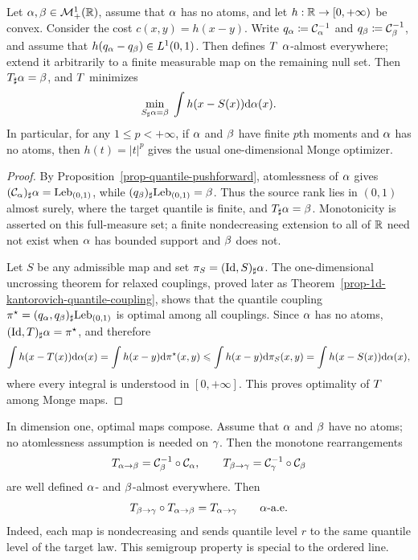 \begin{thm}\label{prop-1d-quantile-map}
	Let $\alpha,\beta\in\mathcal{M}_+^1(\mathbb{R})$, assume that $\alpha$ has no atoms, and let $h:\mathbb{R}\to[0,+\infty)$ be convex. Consider the cost $c(x,y)=h(x-y)$. Write $q_\alpha\coloneqq\mathcal{C}_{\alpha}^{-1}$ and $q_\beta\coloneqq\mathcal{C}_{\beta}^{-1}$, and assume that $h(q_\alpha-q_\beta)\in L^1(0,1)$. Then
	defines $T$ $\alpha$-almost everywhere; extend it arbitrarily to a finite measurable map on the remaining null set. Then $T_\sharp\alpha=\beta$, and $T$ minimizes
	\[
		\underset{S_\sharp\alpha=\beta}{\min}\;\int h(x-S(x))\mathrm{d}\alpha(x).
	\]
	In particular, for any $1\leq p<+\infty$, if $\alpha$ and $\beta$ have finite $p$th moments and $\alpha$ has no atoms, then $h(t)=|t|^p$ gives the usual one-dimensional Monge optimizer.
\end{thm}
\begin{proof}
	By Proposition~\ref{prop-quantile-pushforward}, atomlessness of $\alpha$ gives $(\mathcal{C}_{\alpha})_\sharp\alpha=\mathrm{Leb}_{(0,1)}$, while $(q_\beta)_\sharp\mathrm{Leb}_{(0,1)}=\beta$. Thus the source rank lies in $(0,1)$ almost surely, where the target quantile is finite, and $T_\sharp\alpha=\beta$. Monotonicity is asserted on this full-measure set; a finite nondecreasing extension to all of $\mathbb{R}$ need not exist when $\alpha$ has bounded support and $\beta$ does not.

	Let $S$ be any admissible map and set $\pi_S=(\mathrm{Id},S)_\sharp\alpha$. The one-dimensional uncrossing theorem for relaxed couplings, proved later as Theorem~\ref{prop-1d-kantorovich-quantile-coupling}, shows that the quantile coupling $\pi^\star=(q_\alpha,q_\beta)_\sharp\mathrm{Leb}_{(0,1)}$ is optimal among all couplings. Since $\alpha$ has no atoms, $(\mathrm{Id},T)_\sharp\alpha=\pi^\star$, and therefore
	\[
		\int h(x-T(x))\mathrm{d}\alpha(x)
		=
		\int h(x-y)\mathrm{d}\pi^\star(x,y)
		\leqslant
		\int h(x-y)\mathrm{d}\pi_S(x,y)
		=
		\int h(x-S(x))\mathrm{d}\alpha(x),
	\]
	where every integral is understood in $[0,+\infty]$. This proves optimality of $T$ among Monge maps.
\end{proof}

\begin{rem}\label{rem-1d-composition-optimal}
	In dimension one, optimal maps compose. Assume that $\alpha$ and $\beta$ have no atoms; no atomlessness assumption is needed on $\gamma$. Then the monotone rearrangements
	\[
		T_{\alpha\to\beta}=\mathcal{C}_{\beta}^{-1}\circ\mathcal{C}_{\alpha},
		\qquad
		T_{\beta\to\gamma}=\mathcal{C}_{\gamma}^{-1}\circ\mathcal{C}_{\beta}
	\]
	are well defined $\alpha$- and $\beta$-almost everywhere. Then
	\[
		T_{\beta\to\gamma}\circ T_{\alpha\to\beta}
		=
		T_{\alpha\to\gamma}
		\qquad \alpha\text{-a.e.}
	\]
	Indeed, each map is nondecreasing and sends quantile level $r$ to the same quantile level of the target law. This semigroup property is special to the ordered line.
\end{rem}

